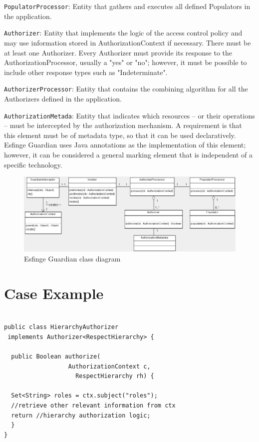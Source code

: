 \documentclass[sigconf]{acmart}
\begin{document}
\noindent \verb|PopulatorProcessor|: Entity that gathers and executes all defined Populators in the application.


\noindent \verb|Authorizer|: Entity that implements the logic of the access control policy and may use information stored in AuthorizationContext if necessary. There must be at least one Authorizer. Every Authorizer must provide its response to the AuthorizationProcessor, usually a "yes" or "no"; however, it must be possible to include other response types such as "Indeterminate".


\noindent \verb|AuthorizerProcessor|: Entity that contains the combining algorithm for all the Authorizers defined in the application.


\noindent \verb|AuthorizationMetada|: Entity that indicates which resources – or their operations – must be intercepted by the authorization mechanism. A requirement is that this element must be of metadata type, so that it can be used declaratively. Esfinge Guardian uses Java annotations as the implementation of this element; however, it can be considered a general marking element that is independent of a specific technology.



\begin{figure}
  \centering
  \includegraphics[scale=0.45]{img/guardian-class-diagram.png}
  \caption{Esfinge Guardian class diagram \cite{Silva2013}}
  \label{fig:guardian-class-diagram}
\end{figure}



\section{Case Example}

\begin{lstlisting}

public class HierarchyAuthorizer
 implements Authorizer<RespectHierarchy> {

  public Boolean authorize(
                  AuthorizationContext c,
                    RespectHierarchy rh) {

  Set<String> roles = ctx.subject("roles");
  //retrieve other relevant information from ctx
  return //hierarchy authorization logic;
  }
}

\end{lstlisting}
\end{document}
